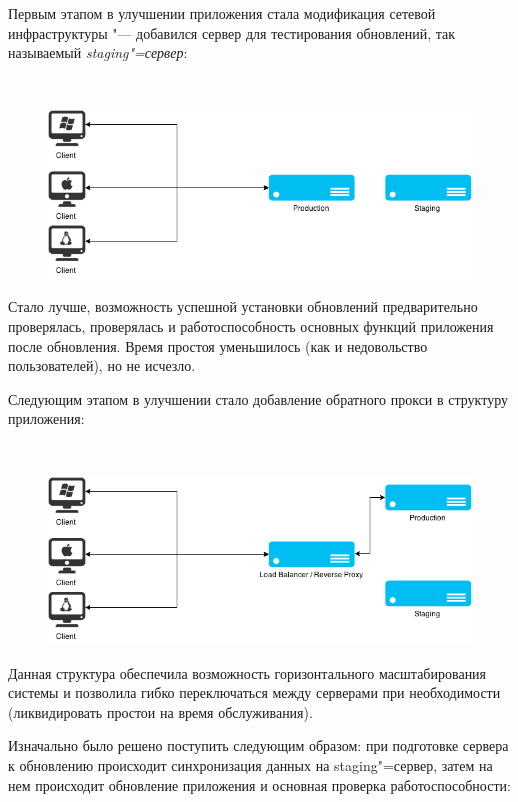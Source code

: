 \documentclass[10pt, a5paper]{article}
\begin{document}
Первым этапом в улучшении приложения стала модификация сетевой инфраструктуры "--- добавился сервер для тестирования обновлений, так называемый \emph{staging"=сервер}:

~

\begin{figure}[h!]
  \centering
  \includegraphics[scale=0.36]{02_2015_02_staging}
\end{figure}

Стало лучше, возможность успешной установки обновлений предварительно проверялась, проверялась и работоспособность основных функций приложения после обновления. Время простоя уменьшилось (как и недовольство пользователей), но не исчезло.

Следующим этапом в улучшении стало добавление обратного прокси в структуру приложения:

~

\begin{figure}[h!]
  \centering
  \includegraphics[scale=0.36]{02_2015_03_working}
\end{figure}

Данная структура обеспечила возможность горизонтального масштабирования системы и позволила гибко переключаться между серверами при необходимости (ликвидировать простои на время обслуживания).


Изначально было решено поступить следующим образом: при подготовке сервера к обновлению происходит синхронизация данных на staging"=сервер, затем на нем происходит обновление приложения и основная проверка работоспособности:
\end{document}
